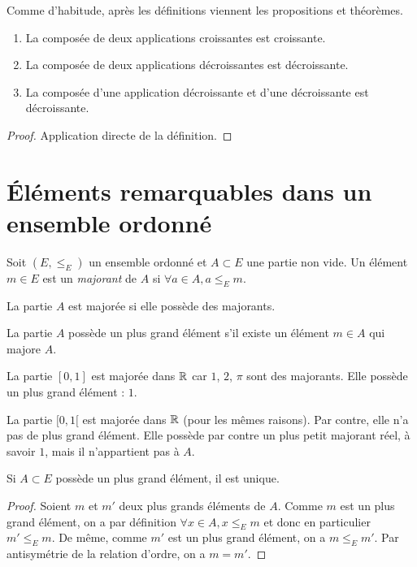 Comme d'habitude, après les définitions viennent les propositions et théorèmes.

\begin{proposition}
\begin{enumerate}
\item La composée de deux applications croissantes est croissante.
\item La composée de deux applications décroissantes est décroissante.
\item La composée d'une application décroissante et d'une décroissante est décroissante.
\end{enumerate}
\end{proposition}

\begin{proof}
Application directe de la définition.
\end{proof}

\section{Éléments remarquables dans un ensemble ordonné}

Soit $(E,\leq_E)$ un ensemble ordonné et $A\subset E$ une partie non vide. Un élément $m\in E$ est un \emph{majorant} de $A$ si $\forall a\in A, a\leq_E m$.

La partie $A$ est majorée si elle possède des majorants.

La partie $A$ possède un plus grand élément s'il existe un élément $m\in A$ qui majore $A$.

\begin{exemple}
La partie $[0,1]$ est majorée dans $\mathbb{R}$ car $1$, $2$, $\pi$ sont des majorants. Elle possède un plus grand élément : $1$.

La partie $[0,1[$ est majorée dans $\mathbb{R}$ (pour les mêmes raisons). Par contre, elle n'a pas de plus grand élément. Elle possède par contre un plus petit majorant réel, à savoir $1$, mais il n'appartient pas à  $A$.
\end{exemple}

\begin{proposition}
Si $A\subset E$ possède un plus grand élément, il est unique.
\end{proposition}
\begin{proof}
Soient $m$ et $m'$ deux plus grands éléments de $A$. Comme $m$ est un plus grand élément, on a par définition $\forall x\in A, x\leq_E m$ et donc en particulier $m'\leq_E m$. De même, comme $m'$ est un plus grand élément, on a $m\leq_E m'$. Par antisymétrie de la relation d'ordre, on a $m=m'$.
\end{proof}

